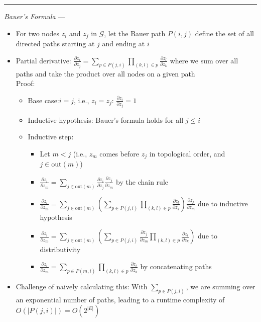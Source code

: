 {\color{lightgray}\hrule height 0.001mm}

\emph{Bauer's Formula} ---
\begin{itemize} 
    \item For two nodes $z_i$ and $z_j$ in $\mathcal{G}$, let the Bauer path $P(i, j)$ define the set of all directed paths starting at $j$ and ending at $i$
    \item Partial derivative:
    $
    \frac{\partial z_i}{\partial z_j} = \sum_{p \in P(j, i)} \prod_{(k, l) \in p} \frac{\partial z_l}{\partial z_k}
    $ where we sum over all paths and take the product over all nodes on a given path\\
    Proof:
    \begin{itemize}
        \item Base case:$i = j$, i.e., $z_i = z_j$:
        $\frac{\partial z_i}{\partial z_j} = 1$
        \item Inductive hypothesis: Bauer's formula holds for all $j \leq i$
        \item Inductive step:
        \begin{itemize}
            \item Let $m < j$ (i.e., $z_m$ comes before $z_j$ in topological order, and $j \in \textrm{out}(m)$)
            \item $
            \frac{\partial z_i}{\partial z_m} = \sum_{j \in \textrm{out}(m)} \frac{\partial z_i}{\partial z_j} \frac{\partial z_j}{\partial z_m}
            $ by the chain rule
            \item $
            \frac{\partial z_i}{\partial z_m} = \sum_{j \in \textrm{out}(m)} (\sum_{p \in P(j, i)} \prod_{(k, l) \in p} \frac{\partial z_l}{\partial z_k}) \frac{\partial z_j}{\partial z_m}
            $ due to inductive hypothesis
            \item $
            \frac{\partial z_i}{\partial z_m} = \sum_{j \in \textrm{out}(m)} (\sum_{p \in P(j, i)} \frac{\partial z_j}{\partial z_m} \prod_{(k, l) \in p} \frac{\partial z_l}{\partial z_k})
            $ due to distributivity
            \item $
            \frac{\partial z_i}{\partial z_m} = \sum_{p \in P(m, i)} \prod_{(k, l) \in p} \frac{\partial z_l}{\partial z_k}
            $ by concatenating paths
        \end{itemize}
    \end{itemize}
    \item Challenge of naively calculating this: With $\sum_{p \in P(j, i)}$, we are summing over an exponential number of paths, leading to a runtime complexity of $O(|P(j, i)|) = O(2^{|E|})$ 
\end{itemize} 

